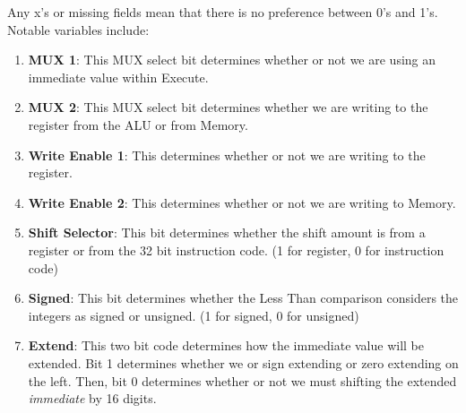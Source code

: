 \documentclass{article}
\begin{document}
\normalsize
Any x's or missing fields mean that there is no preference between 0's and 1's. Notable variables include:
\begin{enumerate}
\item
\textbf{MUX 1}: This MUX select bit determines whether or not we are using an immediate value within Execute.

\item
\textbf{MUX 2}: This MUX select bit determines whether we are writing to the register from the ALU or from Memory.

\item
\textbf{Write Enable 1}: This determines whether or not we are writing to the register.

\item
\textbf{Write Enable 2}: This determines whether or not we are writing to Memory.

\item
\textbf{Shift Selector}: This bit determines whether the shift amount is from a register or from the 32 bit instruction code. (1 for register, 0 for instruction code)

\item
\textbf{Signed}: This bit determines whether the Less Than comparison considers the integers as signed or unsigned. (1 for signed, 0 for unsigned)

\item
\textbf{Extend}: This two bit code determines how the immediate value will be extended. Bit 1 determines whether we or sign extending or zero extending on the left. Then, bit 0 determines whether or not we must shifting the extended \textit{immediate} by 16 digits.

\end{enumerate}
\end{document}
